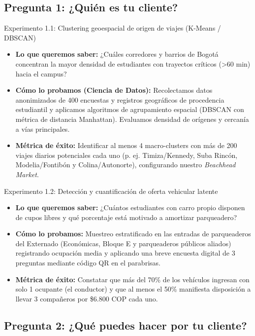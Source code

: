 \documentclass[11pt,a4paper]{article}
\begin{document}
\subsection{Pregunta 1: ¿Quién es tu cliente?}

\begin{kbibox}{Experimento 1.1: Clustering geoespacial de origen de viajes (K-Means / DBSCAN)}
\begin{itemize}[leftmargin=*]
    \item \textbf{Lo que queremos saber:} ¿Cuáles corredores y barrios de Bogotá concentran la mayor densidad de estudiantes con trayectos críticos (>60 min) hacia el campus?
    \item \textbf{Cómo lo probamos (Ciencia de Datos):} Recolectamos datos anonimizados de 400 encuestas y registros geográficos de procedencia estudiantil y aplicamos algoritmos de agrupamiento espacial (DBSCAN con métrica de distancia Manhattan). Evaluamos densidad de orígenes y cercanía a vías principales.
    \item \textbf{Métrica de éxito:} Identificar al menos 4 macro-clusters con más de 200 viajes diarios potenciales cada uno (p. ej. Timiza/Kennedy, Suba Rincón, Modelia/Fontibón y Colina/Autonorte), configurando nuestro \textit{Beachhead Market}.
\end{itemize}
\end{kbibox}

\begin{kbibox}{Experimento 1.2: Detección y cuantificación de oferta vehicular latente}
\begin{itemize}[leftmargin=*]
    \item \textbf{Lo que queremos saber:} ¿Cuántos estudiantes con carro propio disponen de cupos libres y qué porcentaje está motivado a amortizar parqueadero?
    \item \textbf{Cómo lo probamos:} Muestreo estratificado en las entradas de parqueaderos del Externado (Económicas, Bloque E y parqueaderos públicos aliados) registrando ocupación media y aplicando una breve encuesta digital de 3 preguntas mediante código QR en el parabrisas.
    \item \textbf{Métrica de éxito:} Constatar que más del 70\% de los vehículos ingresan con solo 1 ocupante (el conductor) y que al menos el 50\% manifiesta disposición a llevar 3 compañeros por \$6.800 COP cada uno.
\end{itemize}
\end{kbibox}

\subsection{Pregunta 2: ¿Qué puedes hacer por tu cliente?}
\end{document}
